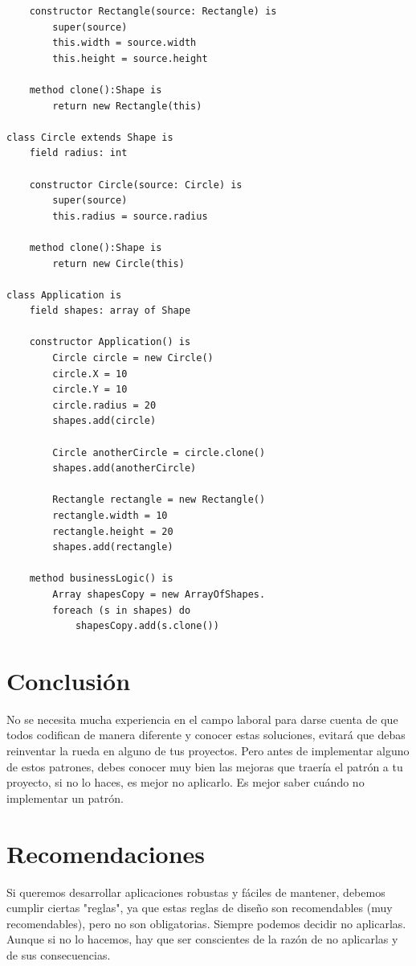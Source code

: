 \documentclass{article}
\begin{document}
\begin{multicols}{2}
\begin{verbatim}
    constructor Rectangle(source: Rectangle) is
        super(source)
        this.width = source.width
        this.height = source.height

    method clone():Shape is
        return new Rectangle(this)

class Circle extends Shape is
    field radius: int

    constructor Circle(source: Circle) is
        super(source)
        this.radius = source.radius

    method clone():Shape is
        return new Circle(this)

class Application is
    field shapes: array of Shape

    constructor Application() is
        Circle circle = new Circle()
        circle.X = 10
        circle.Y = 10
        circle.radius = 20
        shapes.add(circle)

        Circle anotherCircle = circle.clone()
        shapes.add(anotherCircle)

        Rectangle rectangle = new Rectangle()
        rectangle.width = 10
        rectangle.height = 20
        shapes.add(rectangle)

    method businessLogic() is
        Array shapesCopy = new ArrayOfShapes.
        foreach (s in shapes) do
            shapesCopy.add(s.clone())
\end{verbatim}

\section{Conclusión}
 No se necesita mucha experiencia en el campo laboral para darse cuenta de que todos codifican de manera diferente y conocer estas soluciones, evitará que debas reinventar la rueda en alguno de tus proyectos. Pero antes de implementar alguno de estos patrones, debes conocer muy bien las mejoras que traería el patrón a tu proyecto, si no lo haces, es mejor no aplicarlo. Es mejor saber cuándo no implementar un patrón.

\section{Recomendaciones}
Si queremos desarrollar aplicaciones robustas y fáciles de mantener, debemos cumplir ciertas "reglas", ya que estas reglas de diseño son recomendables (muy recomendables), pero no son obligatorias. Siempre podemos decidir no aplicarlas. Aunque si no lo hacemos, hay que ser conscientes de la razón de no aplicarlas y de sus consecuencias.

\end{multicols}
\end{document}
